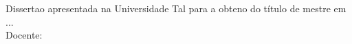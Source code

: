 \begin{titlepage}
  \begin{center}
    \Large{\AUTOR}\\[10cm]
    \Large{\textbf{\TITULO}}\\[2cm]
    \hspace{.45\textwidth} %
    \begin{minipage}{.5\textwidth}
      \begin{normalsize}
        Disserta{\ca}o apresentada na Universidade Tal para a obten{\ca}o do t\'itulo de mestre em ...\\[1.5cm]
        Docente: \ORIENTADOR
      \end{normalsize}
    \end{minipage}
    \vfill

    \begin{normalsize}
      \LOCAL\\
      \DATA
    \end{normalsize}
  \end{center}
\end{titlepage}
